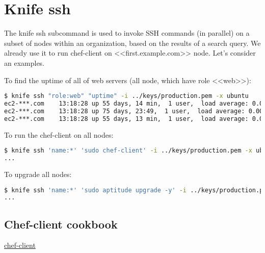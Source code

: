 \section{Knife ssh}

The knife ssh subcommand is used to invoke SSH commands (in parallel) on a subset of nodes within an organization, based on the results of a search query. We already use it to run chef-client on <<first.example.com>> node. Let's consider an examples.

To find the uptime of all of web servers (all node, which have role <<web>>):

\begin{lstlisting}[language=Bash,label=lst:my-server-cloud-knife-ssh1]
$ knife ssh "role:web" "uptime" -i ../keys/production.pem -x ubuntu
ec2-***.com    13:18:28 up 55 days, 14 min,  1 user,  load average: 0.00, 0.01, 0.05
ec2-***.com    13:18:28 up 75 days, 23:49,  1 user,  load average: 0.00, 0.01, 0.05
ec2-***.com    13:18:28 up 55 days, 13 min,  1 user,  load average: 0.08, 0.03, 0.05
\end{lstlisting}

To run the chef-client on all nodes:

\begin{lstlisting}[language=Bash,label=lst:my-server-cloud-knife-ssh2]
$ knife ssh 'name:*' 'sudo chef-client' -i ../keys/production.pem -x ubuntu
...
\end{lstlisting}

To upgrade all nodes:

\begin{lstlisting}[language=Bash,label=lst:my-server-cloud-knife-ssh3]
$ knife ssh 'name:*' 'sudo aptitude upgrade -y' -i ../keys/production.pem -x ubuntu
...
\end{lstlisting}

\subsection{Chef-client cookbook}

\href{http://community.opscode.com/cookbooks/chef-client}{chef-client}